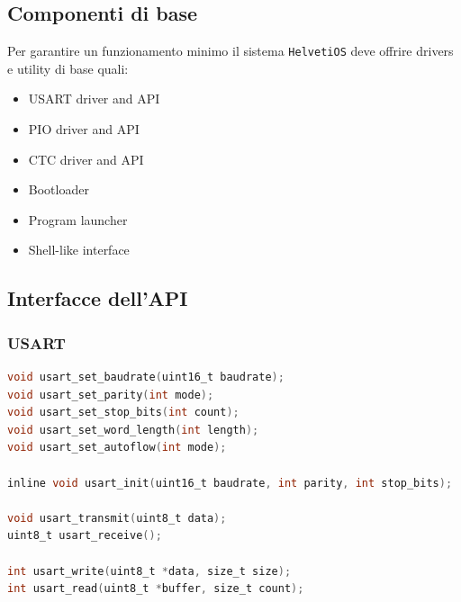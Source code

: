 \documentclass[a4paper, 11pt, twoside]{article}
\begin{document}
\subsection{Componenti di base}

Per garantire un funzionamento minimo il sistema {\tt HelvetiOS} deve offrire
drivers e utility di base quali:

\begin{center}
\begin{minipage}[t]{.4\linewidth}
    \begin{itemize}
        \item USART driver and API
        \item PIO driver and API
        \item CTC driver and API
    \end{itemize}
\end{minipage}%
\begin{minipage}[t]{.4\linewidth}
    \begin{itemize}
        \item Bootloader
        \item Program launcher
        \item Shell-like interface
    \end{itemize}
\end{minipage}
\end{center}

\subsection{Interfacce dell'API} 

\subsubsection{USART}
\begin{lstlisting}[language=C, basicstyle=\ttfamily]
void usart_set_baudrate(uint16_t baudrate);
void usart_set_parity(int mode);
void usart_set_stop_bits(int count);
void usart_set_word_length(int length);
void usart_set_autoflow(int mode);

inline void usart_init(uint16_t baudrate, int parity, int stop_bits); 

void usart_transmit(uint8_t data);
uint8_t usart_receive();

int usart_write(uint8_t *data, size_t size);
int usart_read(uint8_t *buffer, size_t count);
\end{lstlisting}
\end{document}
